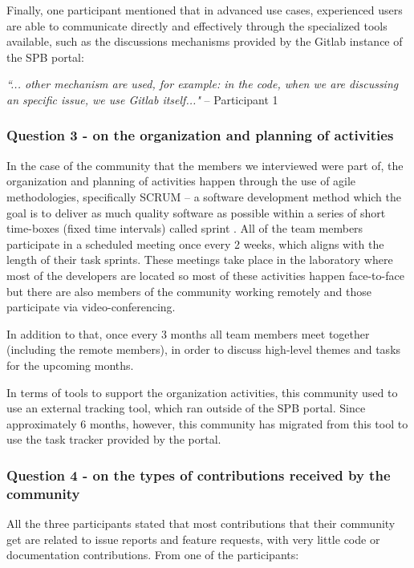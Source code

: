 \documentclass{sigchi}
\begin{document}
Finally, one participant mentioned that in advanced use cases, experienced users are able to communicate directly and effectively through the specialized tools available, such as the discussions mechanisms provided by the Gitlab instance of the SPB portal:

\begin{displayquote}
\textit{``... other mechanism are used, for example: in the code, when we are discussing an specific issue, we use Gitlab itself..."} – Participant 1
\end{displayquote}

\subsubsection{Question 3 - on the organization and planning of activities}
In the case of the community that the members we interviewed were part of, the organization and planning of activities happen through the use of agile methodologies, specifically SCRUM – a software development method which the goal is to deliver as much quality software as possible within a series of short time-boxes (fixed time intervals) called sprint \cite{Beedle1999}. All of the team members participate in a scheduled meeting once every 2 weeks, which aligns with the length of their task sprints. These meetings take place in the laboratory where most of the developers are located so most of these activities happen face-to-face but there are also members of the community working remotely and those participate via video-conferencing.

In addition to that, once every 3 months all team members meet together (including the remote members), in order to discuss high-level themes and tasks for the upcoming months.

In terms of tools to support the organization activities, this community used to use an external tracking tool, which ran outside of the SPB portal. Since approximately 6 months, however, this community has migrated from this tool to use the task tracker provided by the portal.

\subsubsection{Question 4 - on the types of contributions received by the community}

All the three participants stated that most contributions that their community get are related to issue reports and feature requests, with very little code or documentation contributions. From one of the participants:
\end{document}
